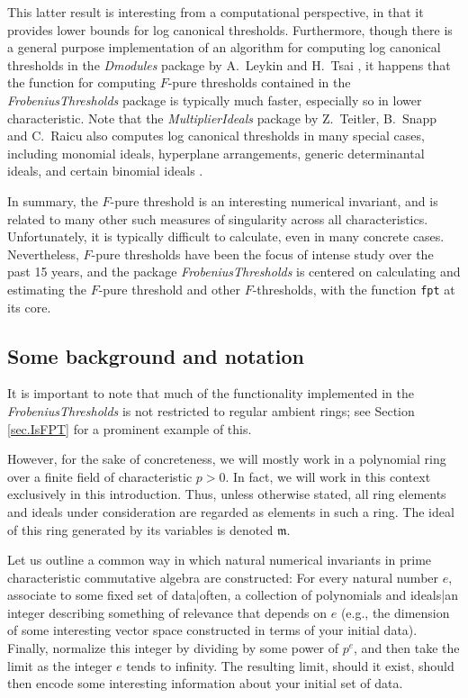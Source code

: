 \documentclass{amsart}
\newcommand{\idealm}{\mathfrak{m}}
\begin{document}
This latter result is interesting from a computational perspective, in that it provides lower bounds for log canonical thresholds.  Furthermore, though there is a general purpose implementation of an algorithm for computing log canonical thresholds in the \emph{Dmodules} package by A.~Leykin and H.~Tsai \cite{DmodulesSource}, it happens that the function for computing $F$-pure thresholds contained in the \emph{FrobeniusThresholds} package is typically much faster, especially so in lower characteristic.  Note that the  \emph{MultiplierIdeals}  package  by Z.~Teitler, B.~Snapp and C.~Raicu also computes log canonical thresholds in many special cases, including monomial ideals, hyperplane arrangements, generic determinantal ideals, and certain binomial ideals \cite{MultiplierIdealsPackage, MultiplierIdealsArticle}.

In summary,  the $F$-pure threshold is an interesting numerical invariant, and is related to many other such measures of singularity across all characteristics.  Unfortunately, it is typically difficult to calculate, even in many concrete cases.  Nevertheless, $F$-pure thresholds have been the focus of intense study over the past 15 years, and the package \emph{FrobeniusThresholds} is centered on calculating and estimating the $F$-pure threshold and other $F$-thresholds, with the function {\tt fpt} at its core.

\subsection*{Some background and notation}
It is important to note that much of the functionality implemented in the \emph{FrobeniusThresholds} is not restricted to regular ambient rings; see Section \ref{sec.IsFPT} for a prominent example of this.

However, for the sake of concreteness, we will mostly work in a polynomial ring over a finite field of  characteristic $p>0$.  In fact,  we will work in this context exclusively in this introduction.  Thus, unless otherwise stated, all ring elements and ideals under consideration are regarded as elements in such a ring.  The ideal of this ring generated by its variables is denoted $\idealm$.

Let us outline a common way in which natural numerical invariants in prime characteristic commutative algebra are constructed:  For every natural number $e$, associate to some fixed set of data|often, a collection of polynomials and ideals|an integer describing something of relevance that depends on $e$ (e.g., the dimension of some interesting vector space constructed in terms of your initial data).   Finally, normalize this integer by dividing by some power of $p^e$, and then take the limit as the integer $e$ tends to infinity.  The resulting limit, should it exist, should then encode some interesting information about your initial set of data.
\end{document}
